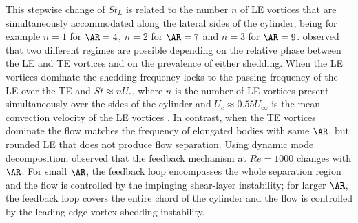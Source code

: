 \documentclass{jfm}
\begin{document}
This stepwise change of $St_L$ is related to the number $n$ of LE vortices that are simultaneously accommodated along the lateral sides of the cylinder, being for example $n=1$ for $\AR=4$, $n=2$ for $\AR=7$ and $n=3$ for $\AR=9$. \cite{chiarini-quadrio-auteri-2022} observed that two different regimes are possible depending on the relative phase between the LE and TE vortices and on the prevalence of either shedding. When the LE vortices dominate the shedding frequency locks to the passing frequency of the LE over the TE and $St \approx n U_c$, where $n$ is the number of LE vortices present simultaneously over the sides of the cylinder and $U_c \approx 0.55 U_\infty$ is the mean convection velocity of the LE vortices \citep[see also][]{mills-sheridan-hourigan-2002,tan-thompson-hourigan-2004}. In contrast, when the TE vortices dominate the flow matches the frequency of elongated bodies with same $\AR$, but rounded LE that does not produce flow separation. Using dynamic mode decomposition, \cite{zhang-etal-2023} observed that the feedback mechanism at $Re = 1000$ changes with $\AR$. For small $\AR$, the feedback loop encompasses the whole separation region and the flow is controlled by the impinging shear-layer instability; for larger $\AR$, the feedback loop covers the entire chord of the cylinder and the flow is controlled by the leading-edge vortex shedding instability.
  
\end{document}

